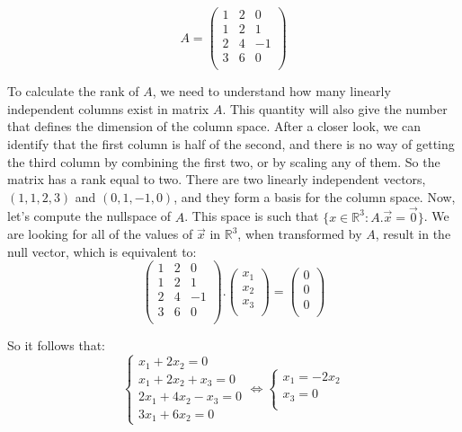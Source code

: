 \documentclass[a4,12pt,twosided,openany]{memoir}
\begin{document}
\[
A = \begin{pmatrix}
1 & 2 & 0 \\
1 & 2 & 1 \\
2 & 4 & -1 \\
3 & 6 & 0 \\
\end{pmatrix}
\]
\par 
\indent
To calculate the rank of $A$, we need to understand how many linearly independent columns exist in matrix $A$. This quantity will also give the number that defines the dimension of the column space. After a closer look, we can identify that the first column is half of the second, and there is no way of getting the third column by combining the first two, or by scaling any of them. So the matrix has a rank equal to two. There are two linearly independent vectors, $(1,1,2,3)$ and $(0,1,−1,0)$, and they form a basis for the column space. Now, let’s compute the nullspace of $A$. This space is such that  $\lbrace x \in \mathbb{R}^3: A.\overrightarrow{x} = \overrightarrow{0} \rbrace$. We are looking for all of the values of $\overrightarrow{x}$ in $\mathbb{R}^3$, when transformed by $A$, result in the null vector, which is equivalent to:
\[
\begin{pmatrix}
1 & 2 & 0 \\
1 & 2 & 1 \\
2 & 4 & -1 \\
3 & 6 & 0 \\
\end{pmatrix} . \begin{pmatrix}
x_1\\
x_2\\
x_3\\
\end{pmatrix} = \begin{pmatrix}
0\\
0\\
0\\
\end{pmatrix}
\]
\par 
\indent
So it follows that:
\[
    \begin{cases}
     x_1 + 2x_2  = 0\\
     x_1 + 2x_2 + x_3 = 0 \\
     2x_1 + 4x_2 - x_3 = 0 \\
     3x_1 + 6x_2 = 0
    \end{cases} \Leftrightarrow \begin{cases}
     x_1 = -2x_2 \\
     x_3 = 0 \\
    \end{cases}
\]
\end{document}
